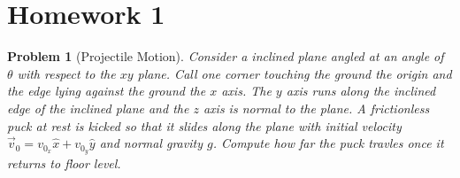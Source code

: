 \documentclass{article}
\theoremstyle{norm}
\newtheorem{prb}[thm]{Problem}
\begin{document}
\section{Homework 1}

\begin{prb}[Projectile Motion]
Consider a inclined plane angled at an angle of $\theta$ with respect to
the $xy$ plane. Call one corner touching the ground the origin and the
edge lying against the ground the $x$ axis. The $y$ axis runs along the
inclined edge of the inclined plane and the $z$ axis is normal to the
plane. A frictionless puck at rest is kicked so that it slides along the
plane with initial velocity $\vec{v}_0 = v_{0_x} \hat{x} + v_{0_y}
\hat{y}$ and normal gravity $g$. Compute how far the puck travles once
it returns to floor level.
\end{prb}
\end{document}
